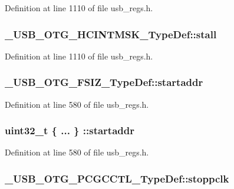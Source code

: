 Definition at line 1110 of file usb\-\_\-regs.\-h.

\hypertarget{group___u_s_b___o_t_g___d_r_i_v_e_r_gaf98c0c2f8a26d5aab736432dbe766081}{
\subsubsection[{stall}]{ \-\_\-\-U\-S\-B\-\_\-\-O\-T\-G\-\_\-\-H\-C\-I\-N\-T\-M\-S\-K\-\_\-\-Type\-Def\-::stall}}\label{group___u_s_b___o_t_g___d_r_i_v_e_r_gaf98c0c2f8a26d5aab736432dbe766081}


Definition at line 1110 of file usb\-\_\-regs.\-h.

\hypertarget{group___u_s_b___o_t_g___d_r_i_v_e_r_ga57e8b7f8a3e82860d5c7e6e95266ca71}{
\subsubsection[{startaddr}]{ \-\_\-\-U\-S\-B\-\_\-\-O\-T\-G\-\_\-\-F\-S\-I\-Z\-\_\-\-Type\-Def\-::startaddr}}\label{group___u_s_b___o_t_g___d_r_i_v_e_r_ga57e8b7f8a3e82860d5c7e6e95266ca71}


Definition at line 580 of file usb\-\_\-regs.\-h.

\hypertarget{group___u_s_b___o_t_g___d_r_i_v_e_r_gabb28e081b471e8498ea60295b43f8eaf}{
\subsubsection[{startaddr}]{\setlength{\rightskip}{0pt plus 5cm}uint32\-\_\-t \{ ... \} \-::startaddr}}\label{group___u_s_b___o_t_g___d_r_i_v_e_r_gabb28e081b471e8498ea60295b43f8eaf}


Definition at line 580 of file usb\-\_\-regs.\-h.

\hypertarget{group___u_s_b___o_t_g___d_r_i_v_e_r_gada5828fd50c36f5120978fa214b87dda}{
\subsubsection[{stoppclk}]{ \-\_\-\-U\-S\-B\-\_\-\-O\-T\-G\-\_\-\-P\-C\-G\-C\-C\-T\-L\-\_\-\-Type\-Def\-::stoppclk}}\label{group___u_s_b___o_t_g___d_r_i_v_e_r_gada5828fd50c36f5120978fa214b87dda}


